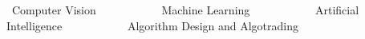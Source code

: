 

\begin{cventries}

\bullet\ Computer Vision
\ \ \ \ \ \ \ \ \ \ 
\bullet\ Machine Learning
\ \ \ \ \ \ \ \ \ \ 
\bullet\ Artificial Intelligence
\ \ \ \ \ \ \ \ \ \ 
\bullet\ Algorithm Design and Algotrading

\end{cventries}
